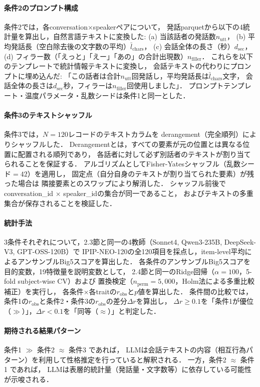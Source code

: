 \documentclass[dvipdfmx,11pt,a4paper]{bxjsarticle}
\begin{document}
\paragraph{条件2のプロンプト構成}
条件2では，各conversation$\times$speakerペアについて，
発話parquetから以下の4統計量を算出し，自然言語テキストに変換した:
(a) 当該話者の発話数$n_{\text{utt}}$，
(b) 平均発話長（空白除去後の文字数の平均）$\bar{l}_{\text{chars}}$，
(c) 会話全体の長さ（秒）$d_{\text{sec}}$，
(d) フィラー数（「えっと」「えー」「あの」の合計出現数）$n_{\text{filler}}$．
これらを以下のテンプレートで統計情報テキストに変換し，
会話テキストの代わりにプロンプトに埋め込んだ:
「この話者は合計$n_{\text{utt}}$回発話し，平均発話長は$\bar{l}_{\text{chars}}$文字，
会話全体の長さは$d_{\text{sec}}$秒，フィラーは$n_{\text{filler}}$回使用しました」．
プロンプトテンプレート・温度パラメータ・乱数シードは条件1と同一とした．

\paragraph{条件3のテキストシャッフル}
条件3では，$N = 120$レコードのテキストカラムを
derangement（完全順列）によりシャッフルした．
Derangementとは，すべての要素が元の位置とは異なる位置に配置される順列であり，
各話者に対して必ず別話者のテキストが割り当てられることを保証する．
アルゴリズムとしてFisher-Yatesシャッフル（乱数シード$= 42$）を適用し，
固定点（自分自身のテキストが割り当てられた要素）が残った場合は
隣接要素とのスワップにより解消した．
シャッフル前後でconversation\_id $\times$ speaker\_idの集合が同一であること，
およびテキストの多重集合が保存されることを検証した．

\paragraph{統計手法}
3条件それぞれについて，2.3節と同一の4教師（Sonnet4, Qwen3-235B, DeepSeek-V3, GPT-OSS-120B）で
IPIP-NEO-120の全120項目を採点し，item-level平均によるアンサンブルBig5スコアを算出した．
各条件のアンサンブルBig5スコアを目的変数，19特徴量を説明変数として，
2.4節と同一のRidge回帰（$\alpha = 100$，5-fold subject-wise CV）および
置換検定（$n_{\text{perm}} = 5{,}000$，Holm法による多重比較補正）を実行し，
各条件$\times$各traitの$r_{\text{obs}}$と$p$値を算出した．
条件間の比較では，条件1の$r_{\text{obs}}$と条件2・条件3の$r_{\text{obs}}$の差分$\Delta r$を算出し，
$\Delta r \geq 0.1$を「条件1が優位（$\gg$）」，$\Delta r < 0.1$を「同等（$\approx$）」と判定した．

\paragraph{期待される結果パターン}
条件1 $\gg$ 条件2 $\approx$ 条件3 であれば，
LLMは会話テキストの内容（相互行為パターン）を利用して性格推定を行っていると解釈される．
一方，条件2 $\approx$ 条件1 であれば，
LLMは表層的統計量（発話量・文字数等）に依存している可能性が示唆される．
\end{document}
